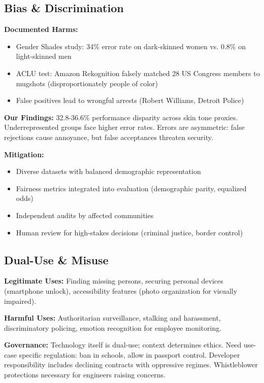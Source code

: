 \documentclass[11pt,a4paper]{article}
\begin{document}
\subsection{Bias \& Discrimination}

\textbf{Documented Harms:}
\begin{itemize}
    \item Gender Shades study: 34\% error rate on dark-skinned women vs. 0.8\% on light-skinned men \cite{buolamwini2018gender}
    \item ACLU test: Amazon Rekognition falsely matched 28 US Congress members to mugshots (disproportionately people of color)
    \item False positives lead to wrongful arrests (Robert Williams, Detroit Police)
\end{itemize}

\textbf{Our Findings:} 32.8-36.6\% performance disparity across skin tone proxies. Underrepresented groups face higher error rates. Errors are asymmetric: false rejections cause annoyance, but false acceptances threaten security.

\textbf{Mitigation:}
\begin{itemize}
    \item Diverse datasets with balanced demographic representation
    \item Fairness metrics integrated into evaluation (demographic parity, equalized odds)
    \item Independent audits by affected communities
    \item Human review for high-stakes decisions (criminal justice, border control)
\end{itemize}

\subsection{Dual-Use \& Misuse}

\textbf{Legitimate Uses:} Finding missing persons, securing personal devices (smartphone unlock), accessibility features (photo organization for visually impaired).

\textbf{Harmful Uses:} Authoritarian surveillance, stalking and harassment, discriminatory policing, emotion recognition for employee monitoring.

\textbf{Governance:} Technology itself is dual-use; context determines ethics. Need use-case specific regulation: ban in schools, allow in passport control. Developer responsibility includes declining contracts with oppressive regimes. Whistleblower protections necessary for engineers raising concerns.
\end{document}
